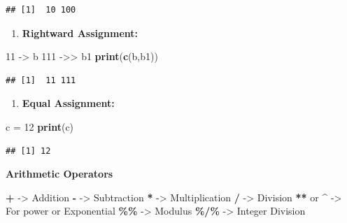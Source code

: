 \documentclass[
]{article}
\newenvironment{Shaded}{\begin{snugshade}}{\end{snugshade}}
\newcommand{\DecValTok}[1]{\textcolor[rgb]{0.00,0.00,0.81}{#1}}
\newcommand{\FunctionTok}[1]{\textcolor[rgb]{0.13,0.29,0.53}{\textbf{#1}}}
\newcommand{\NormalTok}[1]{#1}
\newcommand{\OtherTok}[1]{\textcolor[rgb]{0.56,0.35,0.01}{#1}}
\newcommand{\SpecialCharTok}[1]{\textcolor[rgb]{0.81,0.36,0.00}{\textbf{#1}}}
\providecommand{\tightlist}{%
  \setlength{\itemsep}{0pt}\setlength{\parskip}{0pt}}
\begin{document}
\begin{verbatim}
## [1]  10 100
\end{verbatim}

\begin{enumerate}
\def\labelenumi{\arabic{enumi}.}
\setcounter{enumi}{1}
\tightlist
\item
  \textbf{Rightward Assignment:}
\end{enumerate}

\begin{Shaded}
\begin{Highlighting}[]
\DecValTok{11} \OtherTok{{-}\textgreater{}}\NormalTok{ b}
\DecValTok{111} \OtherTok{{-}\textgreater{}\textgreater{}}\NormalTok{ b1}
\FunctionTok{print}\NormalTok{(}\FunctionTok{c}\NormalTok{(b,b1))}
\end{Highlighting}
\end{Shaded}

\begin{verbatim}
## [1]  11 111
\end{verbatim}

\begin{enumerate}
\def\labelenumi{\arabic{enumi}.}
\setcounter{enumi}{2}
\tightlist
\item
  \textbf{Equal Assignment:}
\end{enumerate}

\begin{Shaded}
\begin{Highlighting}[]
\NormalTok{c }\OtherTok{=} \DecValTok{12}
\FunctionTok{print}\NormalTok{(c)}
\end{Highlighting}
\end{Shaded}

\begin{verbatim}
## [1] 12
\end{verbatim}

\textbf{Arithmetic Operators}

\begin{Shaded}
\begin{Highlighting}[]
\SpecialCharTok{+} \OtherTok{{-}\textgreater{}}\NormalTok{ Addition}
\SpecialCharTok{{-}} \OtherTok{{-}\textgreater{}}\NormalTok{ Subtraction }
\SpecialCharTok{*} \OtherTok{{-}\textgreater{}}\NormalTok{ Multiplication}
\SpecialCharTok{/} \OtherTok{{-}\textgreater{}}\NormalTok{ Division}
\SpecialCharTok{**}\NormalTok{ or }\SpecialCharTok{\^{}} \OtherTok{{-}\textgreater{}}\NormalTok{ For power or Exponential}
\SpecialCharTok{\%\%} \OtherTok{{-}\textgreater{}}\NormalTok{ Modulus}
\SpecialCharTok{\%/\%} \OtherTok{{-}\textgreater{}}\NormalTok{ Integer Division}
\end{Highlighting}
\end{Shaded}
\end{document}
